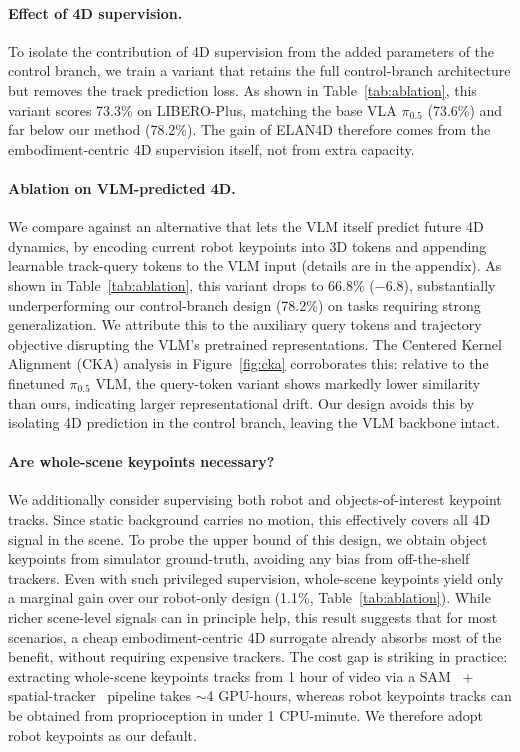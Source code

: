 \paragraph{Effect of 4D supervision.}
To isolate the contribution of 4D supervision from the added parameters of 
the control branch, we train a variant that retains the full control-branch 
architecture but removes the track prediction loss. As shown in 
Table~\ref{tab:ablation}, this variant scores 73.3\% on LIBERO-Plus, matching the base VLA $\pi_{0.5}$ (73.6\%) and far below our method (78.2\%). The gain of ELAN4D therefore comes from the embodiment-centric 4D supervision itself, not from extra capacity.\vspace{-1em}

\paragraph{Ablation on VLM-predicted 4D.}
We compare against an alternative that lets the VLM itself predict future 4D dynamics, by encoding current robot keypoints into 3D tokens and appending learnable track-query tokens to the VLM input (details are in the appendix). As shown in Table~\ref{tab:ablation}, this variant drops to 66.8\% 
($-6.8$), substantially underperforming our control-branch design (78.2\%) on tasks requiring strong generalization. We attribute this to the auxiliary query tokens and trajectory objective disrupting the VLM's pretrained representations. The Centered Kernel Alignment (CKA) analysis in Figure~\ref{fig:cka} corroborates this: relative to the 
finetuned $\pi_{0.5}$ VLM, the query-token variant shows markedly lower similarity than ours, indicating larger representational drift. Our design avoids this by isolating 4D prediction in the control branch, leaving the VLM backbone intact.\vspace{-1em}

\paragraph{Are whole-scene keypoints necessary?}
We additionally consider supervising both robot and 
objects-of-interest keypoint tracks. Since static background carries no motion, this effectively covers all 4D signal in the scene. To probe the upper bound of this design, we obtain object keypoints from simulator ground-truth, avoiding any bias from off-the-shelf trackers. Even with such privileged supervision, whole-scene keypoints yield only a marginal gain over our robot-only design (1.1\%, Table~\ref{tab:ablation}). While richer scene-level signals can in principle help, this result suggests that for most scenarios, a cheap embodiment-centric 4D surrogate already absorbs most of the benefit, without requiring expensive trackers. The cost gap is striking in practice: extracting whole-scene keypoints tracks from 1 hour of 
video via a SAM~\citep{sam} + spatial-tracker~\citep{xiao2025spatialtracker} 
pipeline takes $\sim$4 GPU-hours, whereas robot keypoints tracks can be obtained from proprioception in under 1 CPU-minute. We therefore adopt robot keypoints as our default.\vspace{-1em}

